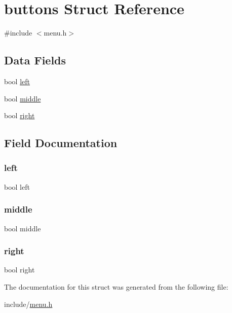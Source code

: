 \hypertarget{structbuttons}{}\section{buttons Struct Reference}
\label{structbuttons}


{\ttfamily \#include $<$menu.\+h$>$}

\subsection*{Data Fields}
\begin{DoxyCompactItemize}
\item 
bool \hyperlink{structbuttons_aef0ceba738a4b7216ac568b5a5c137d3}{left}
\item 
bool \hyperlink{structbuttons_a8cc5e7f4df5287f9292fba5dd15379ea}{middle}
\item 
bool \hyperlink{structbuttons_acd047173db926d54ee91589f7ab53492}{right}
\end{DoxyCompactItemize}


\subsection{Field Documentation}
\mbox{\label{structbuttons_aef0ceba738a4b7216ac568b5a5c137d3}} 
\subsubsection{\texorpdfstring{left}{left}}
{\footnotesize\ttfamily bool left}

\mbox{\label{structbuttons_a8cc5e7f4df5287f9292fba5dd15379ea}} 
\subsubsection{\texorpdfstring{middle}{middle}}
{\footnotesize\ttfamily bool middle}

\mbox{\label{structbuttons_acd047173db926d54ee91589f7ab53492}} 
\subsubsection{\texorpdfstring{right}{right}}
{\footnotesize\ttfamily bool right}



The documentation for this struct was generated from the following file\+:\begin{DoxyCompactItemize}
\item 
include/\hyperlink{menu_8h}{menu.\+h}\end{DoxyCompactItemize}
